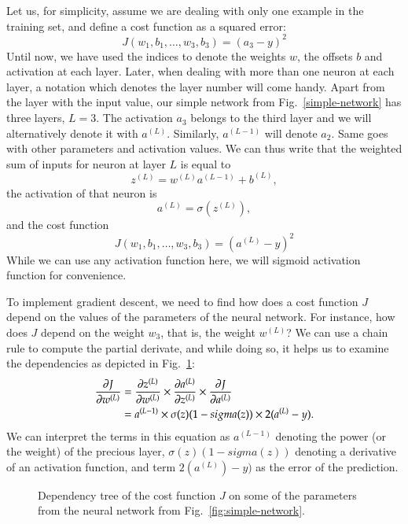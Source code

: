 \begin{refsection}
Let us, for simplicity, assume we are dealing with only one example in the training set, and define a cost function as a squared error:
\begin{equation}
J(w_1, b_1, \ldots, w_3, b_3)=(a_3-y)^2
\end{equation}
Until now, we have used the indices to denote the weights $w$, the offsets $b$ and activation at each layer. Later, when dealing with more than one neuron at each layer, a notation which denotes the layer number will come handy. Apart from the layer with the input value, our simple network from Fig.~\ref{simple-network} has three layers, $L=3$. The activation $a_3$ belongs to the third layer and we will alternatively denote it with $a^{(L)}$. Similarly, $a^{(L-1)}$ will denote $a_2$. Same goes with other parameters and activation values. We can thus write that the weighted sum of inputs for neuron at layer $L$ is equal to
\begin{equation}
z^{(L)}=w^{(L)} a^{(L-1)}+b^{(L)},
\end{equation}
the activation of that neuron is
\begin{equation}
a^{(L)}=\sigma(z^{(L)}),
\end{equation}
and the cost function
\begin{equation}
J(w_1, b_1, \ldots, w_3, b_3)=(a^{(L)}-y)^2
\end{equation}
While we can use any activation function here, we will sigmoid activation function for convenience.

To implement gradient descent, we need to find how does a cost function $J$ depend on the values of the parameters of the neural network. For instance, how does $J$ depend on the weight $w_3$, that is, the weight $w^{(L)}$? We can use a chain rule to compute the partial derivate, and while doing so, it helps us to examine the dependencies as depicted in Fig.~\ref{fig:dependency-tree}:
\begin{align}
\frac{\partial J}{\partial w^{(L)}} & = \frac{\partial z^{(L)}}{\partial w^{(L)}} \times \frac{\partial a^{(L)}}{\partial z^{(L)}} \times \frac{\partial J}{\partial a^{(L)}}\\
& = a^{(L-1)} \times \sigma(z)(1-sigma(z)) \times 2(a^{(L)}-y).
\end{align}
We can interpret the terms in this equation as $a^{(L-1)}$ denoting the power (or the weight) of the precious layer, $\sigma(z)(1-sigma(z))$ denoting a derivative of an activation function, and term $2(a^{(L)})-y)$ as the error of the prediction.

\begin{figure}[htbp]
\caption{Dependency tree of the cost function $J$ on some of the parameters from the neural network from Fig.~\ref{fig:simple-network}.}
\label{fig:dependency-tree}
\end{figure}


\end{refsection}
